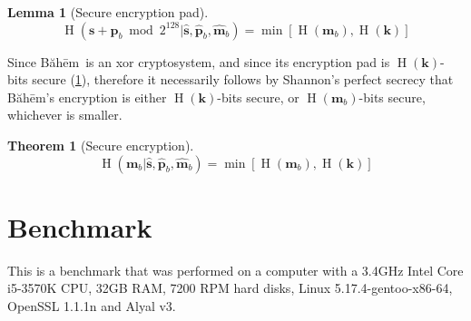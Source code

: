 \documentclass[twocolumn,hidelinks]{article}
\newcommand{\baheem}{Băhēm}
\DeclareMathOperator{\entropy}{H}
\newtheorem{lemma}{Lemma}
\newtheorem{theorem}{Theorem}
\begin{document}
\begin{lemma}[Secure encryption pad]
    \[
        \entropy(
            \mathbf{s} + \mathbf{p}_b \bmod{2^{128}}
            | \mathbf{\hat s},
              \mathbf{\hat p}_b,
              \mathbf{\hat m}_b
        )
        = \min[\entropy(\mathbf{m}_b), \entropy(\mathbf{k})]
    \]
    \label{thrm_baheem_secure_encryption_pad}
\end{lemma}

Since \baheem\ is an \gls{xor} cryptosystem, and since its encryption pad
is $\entropy(\mathbf{k})$-bits secure
(\cref{thrm_baheem_secure_encryption_pad}), therefore it necessarily
follows by Shannon's perfect secrecy \cite{perfect_secrecy} that \baheem's
encryption is either $\entropy(\mathbf{k})$-bits secure, or
$\entropy(\mathbf{m}_b)$-bits secure, whichever is smaller.

\begin{theorem}[Secure encryption]
    \[
        \entropy(
            \mathbf{m}_b
            | \mathbf{\hat s},
              \mathbf{\hat p}_b,
              \mathbf{\hat m}_b
        )
        = \min[\entropy(\mathbf{m}_b), \entropy(\mathbf{k})]
    \]
    \label{thrm_baheem_secure}
\end{theorem}


\section{Benchmark}\label{sec_benchmark}
This is a benchmark that was performed on a computer with a 3.4GHz Intel
Core i5-3570K CPU, 32GB RAM, 7200 RPM hard disks, Linux
5.17.4-gentoo-x86-64, OpenSSL 1.1.1n and Alyal v3.
\end{document}
